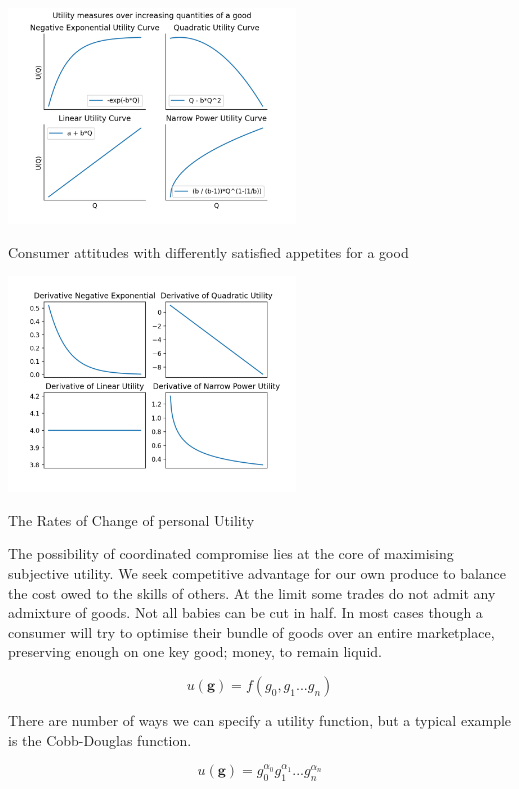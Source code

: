 \documentclass{tufte-handout}
\begin{document}
\begin{marginfigure}
\includegraphics[width=3in]{Plots/utility_in_1_dimension.png}
\caption{Consumer attitudes with differently satisfied appetites for a good}
\includegraphics[width=3in]{Plots/derivatives_of_utility.png}
\caption{The Rates of Change of personal Utility}
\end{marginfigure} 

\noindent The possibility of coordinated compromise lies at the core of maximising subjective utility. We seek competitive advantage for our own produce to balance the cost owed to the skills of others. At the limit some trades do not admit any admixture of goods. Not all babies can be cut in half. In most cases though a consumer will try to optimise their bundle of goods over an entire marketplace, preserving enough on one key good; money, to remain liquid. 

$$ u(\mathbf{g}) = f(g_{0}, g_{1} ... g_{n}) $$

There are number of ways we can specify a utility function, but a typical example is the Cobb-Douglas function. 

$$ u(\mathbf{g}) = g_{0}^{\alpha_{0}}g_{1}^{\alpha_{1}} ... g_{n}^{\alpha_{n}}$$
\end{document}
